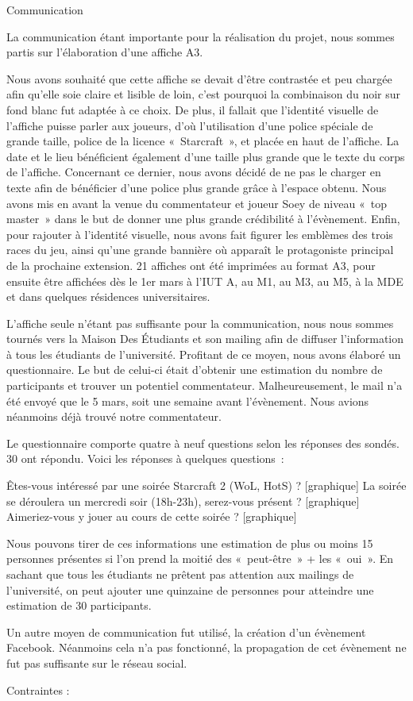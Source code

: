 Communication

	La communication étant importante pour la réalisation du projet, nous sommes partis sur l'élaboration d'une affiche A3.

	Nous avons souhaité que cette affiche se devait d’être contrastée et peu chargée afin qu’elle soie claire et lisible de loin, c’est pourquoi la combinaison du noir sur fond blanc fut adaptée à ce choix. 
	De plus, il fallait que l’identité visuelle de l’affiche puisse parler aux joueurs, d’où l’utilisation d’une police spéciale de grande taille, police de la licence « Starcraft », et placée en haut de l’affiche.
La date et le lieu bénéficient également d’une taille plus grande que le texte du corps de l’affiche.
	Concernant ce dernier, nous avons décidé de ne pas le charger en texte afin de bénéficier d’une police plus grande grâce à l’espace obtenu.
Nous avons mis en avant la venue du commentateur et joueur Soey  de niveau « top master »  dans le but de donner une plus grande crédibilité à l’évènement. 
	Enfin, pour rajouter à l’identité visuelle, nous avons fait figurer  les emblèmes des trois races du jeu, ainsi qu’une grande bannière où apparaît le protagoniste principal de la prochaine extension.
	21 affiches ont été imprimées au format A3, pour ensuite être affichées dès le 1er mars à l’IUT A, au M1, au M3, au M5, à la MDE et dans quelques résidences universitaires.

	L’affiche seule n’étant pas suffisante pour la communication, nous nous sommes tournés vers la Maison Des Étudiants et son mailing afin de diffuser l’information à tous les étudiants de l’université.
	Profitant de ce moyen, nous avons élaboré un questionnaire. Le but de celui-ci était d’obtenir une estimation du nombre de participants et trouver un potentiel commentateur.
Malheureusement, le mail n’a été envoyé que le 5 mars, soit une semaine avant l’évènement.
Nous avions néanmoins déjà trouvé notre commentateur.

Le questionnaire comporte quatre à neuf questions selon les réponses des sondés. 30 ont répondu.
Voici les réponses à quelques questions :


Êtes-vous intéressé par une soirée Starcraft 2 (WoL, HotS) ?
[graphique]
La soirée se déroulera un mercredi soir (18h-23h), serez-vous présent ?
[graphique]
Aimeriez-vous y jouer au cours de cette soirée ?
[graphique]

	Nous pouvons tirer de ces informations une estimation de plus ou moins 15 personnes présentes si l’on prend la moitié des « peut-être » + les « oui ». 
En sachant que tous les étudiants ne prêtent pas attention aux mailings de l’université, on peut ajouter une quinzaine de personnes pour atteindre une estimation de 30 participants.

Un autre moyen de communication fut utilisé, la création d'un évènement Facebook. Néanmoins cela n'a pas fonctionné, 
la propagation de cet évènement ne fut pas suffisante sur le réseau social.


Contraintes :

